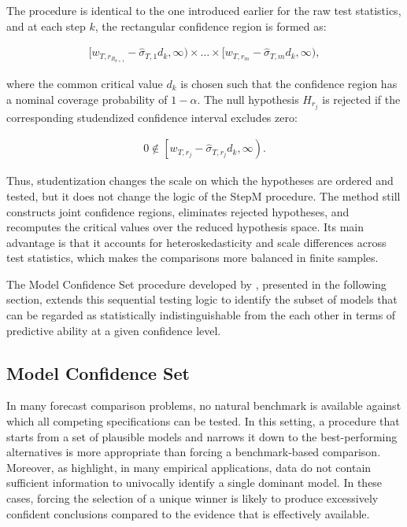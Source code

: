 \documentclass{article} %
\begin{document}
	The procedure is identical to the one introduced earlier for the raw test statistics, and at each step $k$, the rectangular confidence region is formed as:
	
	\begin{align}
		[w_{T,r_{R_{k+1}}}-\hat{\sigma}_{T,1} d_k,\infty)
		\times
		\dots
		\times
		[w_{T,r_m}- \hat{\sigma}_{T,m} d_k ,\infty), \label{eq:stepm_stu_cr}
	\end{align}
	
	where the common critical value $d_k$ is chosen such that the confidence region has a nominal coverage probability of $1-\alpha$. The null hypothesis $H_{r_j}$ is rejected if the corresponding studendized confidence interval excludes zero:
	
	\begin{align}
		0
		\notin
		\left[
		w_{T,r_j}
		-
		\hat{\sigma}_{T,r_j}d_k,
		\infty
		\right).
	\end{align}
	
	Thus, studentization changes the scale on which the hypotheses are ordered and tested, but it does not change the logic of the StepM procedure. The method still constructs joint confidence regions, eliminates rejected hypotheses, and recomputes the critical values over the reduced hypothesis space. Its main advantage is that it accounts for heteroskedasticity and scale differences across test statistics, which makes the comparisons more balanced in finite samples.
	
	The Model Confidence Set procedure developed by \textcite{HANSENLUNDE_NASON2011}, presented in the following section, extends this sequential testing logic to identify the subset of models that can be regarded as statistically indistinguishable from the each other in terms of predictive ability at a given confidence level.
	
	
	\subsection{Model Confidence Set}\label{sec:model-confidence-set}
	In many forecast comparison problems, no natural benchmark is available against which all competing specifications can be tested. In this setting, a procedure that starts from a set of plausible models and narrows it down to the best-performing alternatives is more appropriate than forcing a benchmark-based comparison.	Moreover, as \textcite{HANSENLUNDE_NASON2011} highlight, in many empirical applications, data do not contain sufficient information to univocally identify a single dominant model. In these cases, forcing the selection of a unique winner is likely to produce excessively confident conclusions compared to the evidence that is effectively available.
	
\end{document}
